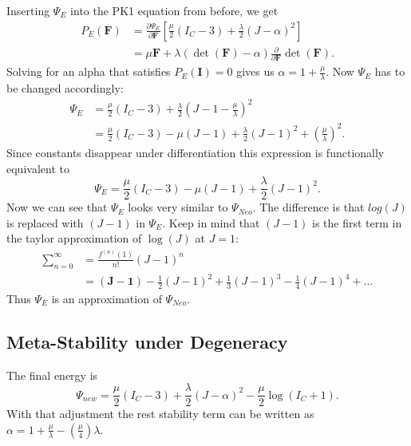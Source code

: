 Inserting $\Psi_E$ into the PK1 equation from before, we get
\begin{align*}
P_{E}(\mathbf{F}) &= \frac{\partial \Psi_{E}}{\partial \mathbf{F}} \left[ \frac{\mu}{2}\left(I_{C}-3\right) +\frac{\lambda}{2}(J-\alpha)^{2} \right] \\
&= \mu \mathbf{F} + \lambda (\operatorname{det}(\mathbf{F})-\alpha)  \frac{\partial}{\partial \mathbf{F}} \operatorname{det}(\mathbf{F}).
\end{align*}
Solving for an alpha that satisfies $P_{E}(\mathbf{I})=0$ gives us $\alpha=1+\frac{\mu}{\lambda}$. Now $\Psi_{E}$ has to be changed accordingly:
\begin{align*}
\Psi_{E} &= \frac{\mu}{2}\left(I_{C}-3\right) +\frac{\lambda}{2}(J-1-\frac{\mu}{\lambda})^{2} \\
&= \frac{\mu}{2}\left(I_{C}-3\right) - \mu\left(J-1\right) + \frac{\lambda}{2}(J-1)^{2} + \left(\frac{\mu}{\lambda}\right)^{2}.
\end{align*}
Since constants disappear under differentiation this expression is functionally equivalent to 
\[
\Psi_{E} = \frac{\mu}{2}\left(I_{C}-3\right) - \mu\left(J-1\right) + \frac{\lambda}{2}(J-1)^{2}.
\]
Now we can see that $\Psi_{E}$ looks very similar to $\Psi_{Neo}$. The difference is that $log(J)$ is replaced with $(J-1)$ in $\Psi_{E}$. Keep in mind that $(J-1)$ is the first term in the taylor approximation of $\operatorname{log}(J)$ at $J=1$:
\begin{align*}
\sum_{n=0}^{\infty} &= \frac{f^{(n)}(1)}{n!} (J-1)^{n} \\
&= \boldsymbol{(J-1)} - \frac{1}{2} (J-1)^{2} + \frac{1}{3} (J-1)^{3} -\frac{1}{4} (J-1)^{4} + \text{...}
\end{align*}
Thus $\Psi_{E}$ is an approximation of $\Psi_{Neo}$.


\subsection{Meta-Stability under Degeneracy}
The final energy is
\begin{equation}\label{eq:stable_energy}
\Psi_{new} = \frac{\mu}{2}\left(I_{C}-3\right) + \frac{\lambda}{2}(J-\alpha)^{2} - \frac{\mu}{2} \operatorname{log}\left(I_{C}+1\right).
\end{equation}
With that adjustment the rest stability term can be written as $\alpha=1+\frac{\mu}{\lambda}-\left(\frac{\mu}{4}\right)\lambda$.

